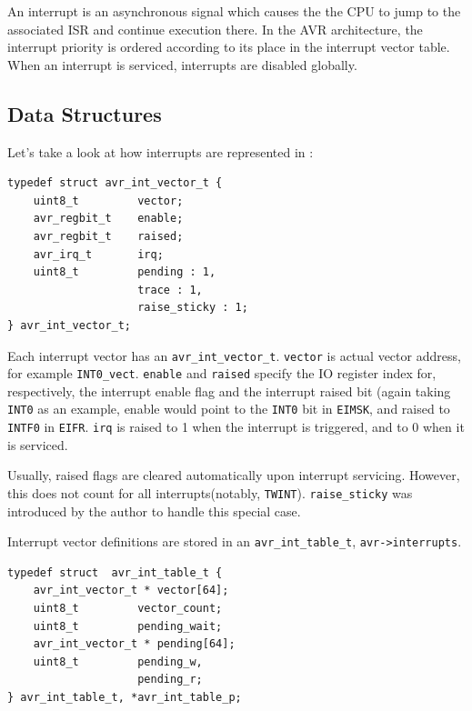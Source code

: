 An interrupt is an asynchronous signal which causes the the \ac{CPU} to jump to
the associated \ac{ISR} and continue execution there. In the \ac{AVR} architecture,
the interrupt priority is ordered according to its place in the interrupt
vector table. When an interrupt is serviced, interrupts are disabled globally.

\subsection{Data Structures}

Let's take a look at how interrupts are represented in \simavr:

\begin{lstlisting}
typedef struct avr_int_vector_t {
    uint8_t         vector;
    avr_regbit_t    enable;
    avr_regbit_t    raised;
    avr_irq_t       irq;
    uint8_t         pending : 1,
                    trace : 1,
                    raise_sticky : 1;
} avr_int_vector_t;
\end{lstlisting}

Each interrupt vector has an \lstinline|avr_int_vector_t|. \lstinline|vector| is
actual vector address, for example \lstinline|INT0_vect|. \lstinline|enable|
and \lstinline|raised| specify the \ac{IO} register index for, respectively, the
interrupt enable flag and the interrupt raised bit (again taking \lstinline|INT0|
as an example, enable would point to the \lstinline|INT0| bit in \lstinline|EIMSK|,
and raised to \lstinline|INTF0| in \lstinline|EIFR|. \lstinline|irq| is raised to
1 when the interrupt is triggered, and to 0 when it is serviced.

Usually, raised flags are cleared automatically upon interrupt servicing. However,
this does not count for all interrupts(notably, \lstinline|TWINT|).
\lstinline|raise_sticky| was introduced by the author to handle this special case.

Interrupt vector definitions are stored in an \lstinline|avr_int_table_t|,
\lstinline|avr->interrupts|.

\begin{lstlisting}
typedef struct  avr_int_table_t {
    avr_int_vector_t * vector[64];
    uint8_t         vector_count;
    uint8_t         pending_wait;
    avr_int_vector_t * pending[64];
    uint8_t         pending_w,
                    pending_r;
} avr_int_table_t, *avr_int_table_p;
\end{lstlisting}

